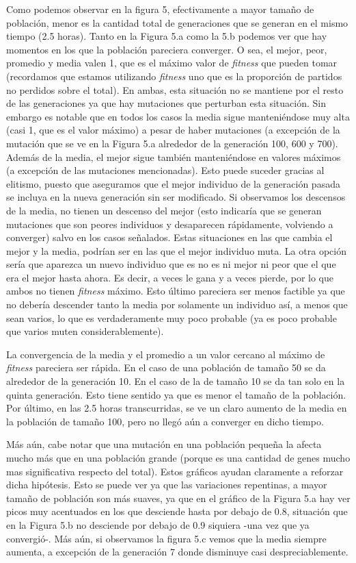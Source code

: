 \documentclass[A4paper,oneside,fleqn,11pt]{article}
\theoremstyle{definition}
\begin{document}
Como podemos observar en la figura 5, efectivamente a mayor tamaño de población, menor es la cantidad total de generaciones que se generan en el mismo tiempo (2.5 horas). Tanto en la Figura 5.a como la 5.b podemos ver que hay momentos en los que la población pareciera converger. O sea, el mejor, peor, promedio y media valen 1, que es el máximo valor de \textit{fitness} que pueden tomar (recordamos que estamos utilizando \textit{fitness} uno que es la proporción de partidos no perdidos sobre el total). En ambas, esta situación no se mantiene por el resto de las generaciones ya que hay mutaciones que perturban esta situación. Sin embargo es notable que en todos los casos la media sigue manteniéndose muy alta (casi 1, que es el valor máximo) a pesar de haber mutaciones (a excepción de la mutación que se ve en la Figura 5.a alrededor de la generación  100, 600 y 700). Además de la media, el mejor sigue también manteniéndose en valores máximos (a excepción de las mutaciones mencionadas). Esto puede suceder gracias al elitismo, puesto que aseguramos que el mejor individuo de la generación pasada se incluya en la nueva generación sin ser modificado. Si observamos los descensos de la media, no tienen un descenso del mejor (esto indicaría que se generan mutaciones que son peores individuos y desaparecen rápidamente, volviendo a converger) salvo en los casos señalados. Estas situaciones en las que cambia el mejor y la media, podrían ser en las que el mejor individuo muta. La otra opción sería que aparezca un nuevo individuo que es no es ni mejor ni peor que el que era el mejor hasta ahora. Es decir, a veces le gana y a veces pierde, por lo que ambos no tienen \textit{fitness} máximo. Esto último pareciera ser menos factible ya que no debería descender tanto la media por solamente un individuo así, a menos que sean varios, lo que es verdaderamente muy poco probable (ya es poco probable que varios muten considerablemente).

La convergencia de la media y el promedio a un valor cercano al máximo de \textit{fitness} pareciera ser rápida. En el caso de una población de tamaño 50 se da alrededor de la generación 10. En el caso de la de tamaño 10 se da tan solo en la quinta generación. Esto tiene sentido ya que es menor el tamaño de la población. Por último, en las 2.5 horas transcurridas, se ve un claro aumento de la media en la población de tamaño 100, pero no llegó aún a converger en dicho tiempo.

Más aún, cabe notar que una mutación en una población pequeña la afecta mucho más que en una población grande (porque es una cantidad de genes mucho mas significativa respecto del total). Estos gráficos ayudan claramente a reforzar dicha hipótesis. Esto se puede ver ya que las variaciones repentinas, a mayor tamaño de población son más suaves, ya que en el gráfico de la Figura 5.a hay ver picos muy acentuados en los que desciende hasta por debajo de 0.8, situación que en la Figura 5.b no desciende por debajo de 0.9 siquiera -una vez que ya convergió-. Más aún, si observamos la figura 5.c vemos que la media siempre aumenta, a excepción de la generación 7 donde disminuye casi despreciablemente. 
\end{document}
